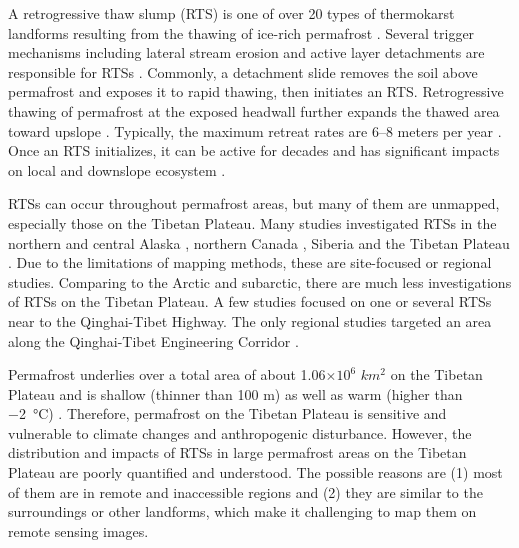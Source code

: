 \documentclass[preprint,12pt,authoryear]{elsarticle}
\begin{document}
A retrogressive thaw slump (RTS) is one of over 20 types of thermokarst landforms resulting from the thawing of ice-rich permafrost \citep{czudek_thermokarst_1970, jorgenson_response_2005, jorgenson_thermokarst_2013,kokelj2013advances}. Several trigger mechanisms including lateral stream erosion and active layer detachments are responsible for RTSs \citep{french2017periglacial}. Commonly, a detachment slide removes the soil above permafrost and exposes it to rapid thawing, then initiates an RTS. Retrogressive thawing of permafrost at the exposed headwall further expands the thawed area toward upslope \citep{jorgenson_thermokarst_2013}. Typically, the maximum retreat rates are 6--8 meters per year \citep{jorgenson_thermokarst_2013}. Once an RTS initializes, it can be active for decades \citep{burn1989geomorphology, lacelle2010climatic, swanson2018growth} and has significant impacts on local and downslope ecosystem \citep{gooseff2009effects, pierre2018unprecedented, zolkos2018mineral}. %

RTSs can occur throughout permafrost areas, but many of them are unmapped, especially those on the Tibetan Plateau. Many studies investigated RTSs in the northern and central Alaska \citep{swanson2018growth,gooseff2009effects,balser2014timing}, northern Canada \citep{burn1989geomorphology, lacelle2010climatic, ramage_terrain_2017, lantuit_fifty_2008, lacelle_distribution_2015, segal2016acceleration, brooker2014investigating, kokelj2017climate, obu2017coastal, ramage_increasing_2018, lantz2008increasing, brooker2014mapping, frappier2017retrogressive, zwieback2018sub, rudy2017terrain, armstrong2018thaw, kokelj2013thawing, rudy2016transferability, burn1990canadian,  cassidy2017impacts}, Siberia \citep{czudek_thermokarst_1970, zwieback2018sub, leibman2003dynamics} and the Tibetan Plateau \citep{wang1995situ, niu2005engineering, niu2012development, niu2014thaw, niu2016thaw, sun2017creep, ma2006slope}. Due to the limitations of mapping methods, these are site-focused or regional studies. Comparing to the Arctic and subarctic, there are much less investigations of RTSs on the Tibetan Plateau. A few studies focused on one or several RTSs near to the Qinghai-Tibet Highway. The only regional studies targeted an area along the Qinghai-Tibet Engineering Corridor \citep{niu2014thaw, niu2016thaw}. 

Permafrost underlies over a total area of about 1.06$\times10^6$ $km^2$ on the Tibetan Plateau \citep{zou2017new} and is shallow (thinner than 100 m) as well as warm (higher than \SI{-2}{\celsius}) \citep{zhou_geocryology_2000}. Therefore, permafrost on the Tibetan Plateau is sensitive and vulnerable to climate changes and anthropogenic disturbance. However, the distribution and impacts of RTSs in large permafrost areas on the Tibetan Plateau are poorly quantified and understood. The possible reasons are (1) most of them are in remote and inaccessible regions and (2) they are similar to the surroundings or other landforms, which make it challenging to map them on remote sensing images.  %
%
\end{document}
